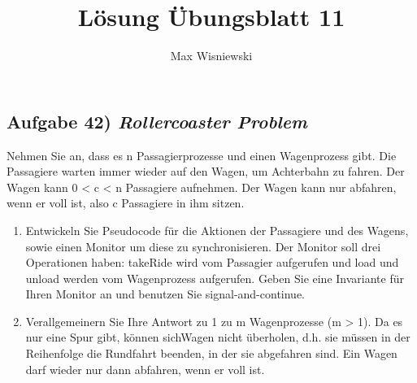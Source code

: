 \documentclass[ngerman,a4paper,11pt]{article}
\title{Lösung Übungsblatt 11}
\author{Max Wisniewski}
\date{}
\begin{document}
   

\maketitle

\subsection*{Aufgabe 42) \mdseries\itshape Rollercoaster Problem}

Nehmen Sie an, dass es n Passagierprozesse
und einen Wagenprozess gibt. Die Passagiere warten immer wieder auf den Wagen, um
Achterbahn zu fahren. Der Wagen kann 0 < c < n Passagiere aufnehmen. Der Wagen kann nur
abfahren, wenn er voll ist, also c Passagiere in ihm sitzen.

\begin{enumerate}[1.]
	\item Entwickeln Sie Pseudocode für die Aktionen der Passagiere und des Wagens, sowie einen
		Monitor um diese zu synchronisieren. Der Monitor soll drei Operationen haben: takeRide
		wird vom Passagier aufgerufen und load und unload werden vom Wagenprozess aufgerufen.
		Geben Sie eine Invariante für Ihren Monitor an und benutzen Sie signal-and-continue.
	\item Verallgemeinern Sie Ihre Antwort zu 1 zu m Wagenprozesse (m > 1). Da es nur eine Spur
		gibt, können sichWagen nicht überholen, d.h. sie müssen in der Reihenfolge die Rundfahrt
		beenden, in der sie abgefahren sind. Ein Wagen darf wieder nur dann abfahren, wenn er
		voll ist.
\end{enumerate}
\end{document}
